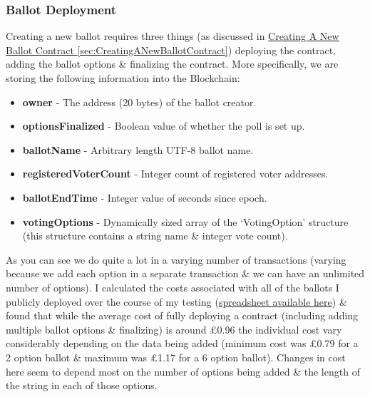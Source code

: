 \documentclass{article}
\begin{document}
	\subsubsection{Ballot Deployment}
	Creating a new ballot requires three things (as discussed in {\Large \hyperref[sec:CreatingANewBallotContract]{Creating A New Ballot Contract \ref*{sec:CreatingANewBallotContract}}}) deploying the contract, adding the ballot options \& finalizing the contract. More specifically, we are storing the following information into the Blockchain:
	\begin{itemize}
		\item \textbf{owner} - The address (20 bytes) of the ballot creator.
		\item \textbf{optionsFinalized} - Boolean value of whether the poll is set up.
		\item \textbf{ballotName} - Arbitrary length UTF-8 ballot name.
		\item \textbf{registeredVoterCount} - Integer count of registered voter addresses.
		\item \textbf{ballotEndTime} - Integer value of seconds since epoch.
		\item \textbf{votingOptions} - Dynamically sized array of the `VotingOption' structure (this structure contains a string name \& integer vote count).
	\end{itemize}
	
	As you can see we do quite a lot in a varying number of transactions (varying because we add each option in a separate transaction \& we can have an unlimited number of options). I calculated the costs associated with all of the ballots I publicly deployed over the course of my testing (\href{https://docs.google.com/spreadsheets/d/1dyLkpD-rdH4eHFEsdPrLEXX45YHl9XLGppbYgYYsTOo/edit?usp=sharing}{spreadsheet available here}) \& found that while the average cost of fully deploying a contract (including adding multiple ballot options \& finalizing) is around \pounds0.96 the individual cost vary considerably depending on the data being added (minimum cost was \pounds0.79 for a 2 option ballot \& maximum was \pounds1.17 for a 6 option ballot). Changes in cost here seem to depend most on the number of options being added \& the length of the string in each of those options.
	
\end{document}
